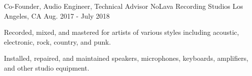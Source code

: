 \begin{cventries}

  \cventry
    {Co-Founder, Audio Engineer, Technical Advisor} %
    {NoLava Recording Studios} %
    {Los Angeles, CA} %
    {Aug. 2017 - July 2018} %
    {
      \begin{cvitems} %
        \item {Recorded, mixed, and mastered for artists of various styles including acoustic, electronic, rock, country, and punk.}
        \item {Installed, repaired, and maintained speakers, microphones, keyboards, amplifiers, and other studio equipment.}
      \end{cvitems}
    }

\end{cventries}
